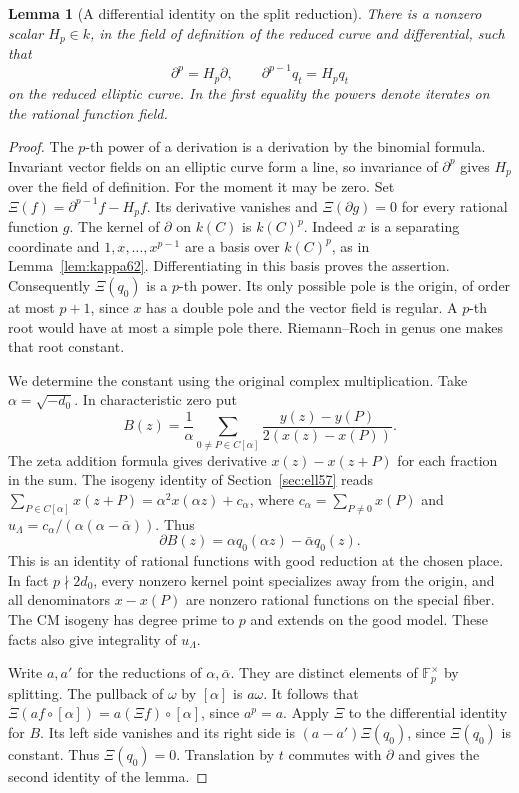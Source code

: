 \documentclass[a4paper,11pt]{article}
\newtheorem{lemma}[proposition]{Lemma}
\theoremstyle{definition}
\theoremstyle{remark}
\numberwithin{equation}{section}
\begin{document}
\begin{lemma}[A differential identity on the split reduction]\leavevmode
\label{lem:splitcmder480}
There is a nonzero scalar \(H_p\in k\), in the field of definition
of the reduced curve and differential, such that
\[
              \partial^p=H_p\partial,\qquad
              \partial^{p-1}q_t=H_pq_t
\]
on the reduced elliptic curve. In the first equality the powers
denote iterates on the rational function field.
\end{lemma}
\begin{proof}
The \(p\)-th power of a derivation is a derivation by the binomial
formula. Invariant vector fields on an elliptic curve form a line,
so invariance of \(\partial^p\) gives \(H_p\) over the field of
definition. For the moment it may be zero. Set
\(\Xi(f)=\partial^{p-1}f-H_pf\). Its derivative vanishes and
\(\Xi(\partial g)=0\) for every rational function \(g\).
The kernel of \(\partial\) on \(k(C)\) is \(k(C)^p\). Indeed
\(x\) is a separating coordinate and \(1,x,\ldots,x^{p-1}\)
are a basis over \(k(C)^p\), as in Lemma~\ref{lem:kappa62}.
Differentiating in this basis proves the assertion.
Consequently \(\Xi(q_0)\) is a \(p\)-th power. Its only possible
pole is the origin, of order at most \(p+1\), since \(x\) has
a double pole and the vector field is regular. A \(p\)-th root
would have at most a simple pole there. Riemann--Roch in genus
one makes that root constant.

We determine the constant using the original complex multiplication.
Take \(\alpha=\sqrt{-d_0}\). In characteristic zero put
\[
 B(z)=\frac1{\alpha}\sum_{0\ne P\in C[\alpha]}
              \frac{y(z)-y(P)}{2(x(z)-x(P))}.
\]
The zeta addition formula gives derivative \(x(z)-x(z+P)\)
for each fraction in the sum. The isogeny identity of
Section~\ref{sec:ell57} reads
\(\sum_{P\in C[\alpha]}x(z+P)=\alpha^2 x(\alpha z)+c_\alpha\),
where \(c_\alpha=\sum_{P\ne0}x(P)\) and
\(u_\Lambda=c_\alpha/(\alpha(\alpha-\bar\alpha))\).
Thus
\[
          \partial B(z)=\alpha q_0(\alpha z)-\bar\alpha q_0(z).
\]
This is an identity of rational functions with good reduction at
the chosen place. In fact \(p\nmid 2d_0\), every nonzero kernel
point specializes away from the origin, and all denominators
\(x-x(P)\) are nonzero rational functions on the special fiber.
The CM isogeny has degree prime to \(p\) and extends on the good
model. These facts also give integrality of \(u_\Lambda\).

Write \(a,a'\) for the reductions of \(\alpha,\bar\alpha\).
They are distinct elements of \(\mathbb F_p^\times\) by splitting.
The pullback of \(\omega\) by \([\alpha]\) is \(a\omega\).
It follows that
\(\Xi(a f\circ[\alpha])=a(\Xi f)\circ[\alpha]\), since \(a^p=a\).
Apply \(\Xi\) to the differential identity for \(B\).
Its left side vanishes and its right side is
\((a-a')\Xi(q_0)\), since \(\Xi(q_0)\) is constant.
Thus \(\Xi(q_0)=0\). Translation by \(t\) commutes with \(\partial\)
and gives the second identity of the lemma.


\end{proof}
\end{document}
